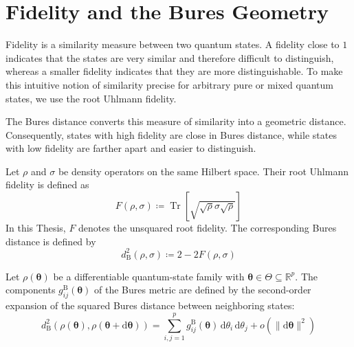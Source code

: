 \section{Fidelity and the Bures Geometry}
Fidelity is a similarity measure between two quantum states. A fidelity close to $1$ indicates that the states are very similar and therefore difficult to distinguish, whereas a smaller fidelity indicates that they are more distinguishable. To make this intuitive notion of similarity precise for arbitrary pure or mixed quantum states, we use the root Uhlmann fidelity.

The Bures distance converts this measure of similarity into a geometric distance. Consequently, states with high fidelity are close in Bures distance, while states with low fidelity are farther apart and easier to distinguish.

\begin{definition}
    Let $\rho$ and $\sigma$ be density operators on the same Hilbert space. Their root Uhlmann fidelity is defined as
    \begin{equation}
        F(\rho,\sigma)\coloneqq
        \operatorname{Tr}\!\left[\sqrt{\sqrt{\rho}\sigma\sqrt{\rho}}\right]
        \label{eq:root_fidelity}
    \end{equation}
    In this Thesis, $F$ denotes the unsquared root fidelity. The corresponding Bures distance is defined by
    \begin{equation}
        d_{\mathrm B}^2(\rho,\sigma)\coloneqq2-2F(\rho,\sigma)
        \label{def:bures_distance}
    \end{equation}
\end{definition}

\begin{definition}
    Let $\rho(\boldsymbol{\theta})$ be a differentiable quantum-state family with $\boldsymbol{\theta}\in\Theta\subseteq\mathbb{R}^p$. The components $g_{ij}^{\mathrm B}(\boldsymbol{\theta})$ of the Bures metric are defined by the second-order expansion of the squared Bures distance between neighboring states:
    \begin{equation}
        d_{\mathrm B}^2
        \left(
        \rho(\boldsymbol{\theta}),
        \rho(\boldsymbol{\theta}+\mathrm{d}\boldsymbol{\theta})
        \right)
        =
        \sum_{i,j=1}^{p}
        g_{ij}^{\mathrm B}(\boldsymbol{\theta})
        \,\mathrm{d}\theta_i\,\mathrm{d}\theta_j
        +
        o\!\left(
        \lVert\mathrm{d}\boldsymbol{\theta}\rVert^2
        \right)
        \label{eq:bures_local_expansion}
    \end{equation}
\end{definition}

